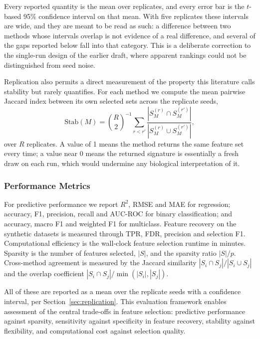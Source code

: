 \documentclass[11pt]{article}
\begin{document}
Every reported quantity is the mean over replicates, and every error bar is the
$t$-based 95\% confidence interval on that mean. With five replicates these
intervals are wide, and they are meant to be read as such: a difference between
two methods whose intervals overlap is not evidence of a real difference, and
several of the gaps reported below fall into that category. This is a deliberate
correction to the single-run design of the earlier draft, where apparent
rankings could not be distinguished from seed noise.

Replication also permits a direct measurement of the property this literature
calls stability but rarely quantifies. For each method we compute the mean
pairwise Jaccard index between its own selected sets across the replicate seeds,
\begin{equation}
\mathrm{Stab}(M) = \binom{R}{2}^{-1} \sum_{r < r'} \frac{|S_M^{(r)} \cap S_M^{(r')}|}{|S_M^{(r)} \cup S_M^{(r')}|},
\end{equation}
over $R$ replicates. A value of 1 means the method returns the same feature set
every time; a value near 0 means the returned signature is essentially a fresh
draw on each run, which would undermine any biological interpretation of it.

\subsubsection{Performance Metrics}

For predictive performance we report $R^2$, RMSE and MAE for regression; accuracy, F1, precision,
recall and AUC-ROC for binary classification; and accuracy, macro F1 and weighted F1 for multiclass.
Feature recovery on the synthetic datasets is measured through TPR, FDR, precision and selection F1.
Computational efficiency is the wall-clock feature selection runtime in minutes. Sparsity is the
number of features selected, $|S|$, and the sparsity ratio $|S|/p$. Cross-method agreement is
measured by the Jaccard similarity $|S_i \cap S_j| / |S_i \cup S_j|$ and the overlap coefficient
$|S_i \cap S_j| / \min(|S_i|, |S_j|)$.

All of these are reported as a mean over the replicate seeds with a confidence interval, per
Section~\ref{sec:replication}. This evaluation framework enables assessment of the central trade-offs
in feature selection: predictive performance against sparsity, sensitivity against specificity in
feature recovery, stability against flexibility, and computational cost against selection quality.
\end{document}

